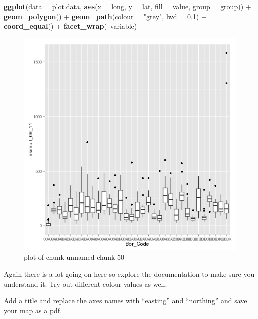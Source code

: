 \documentclass[]{article}
\makeatletter
\newenvironment{Shaded}{}{}
\newcommand{\KeywordTok}[1]{\textcolor[rgb]{0.00,0.44,0.13}{\textbf{{#1}}}}
\newcommand{\DataTypeTok}[1]{\textcolor[rgb]{0.56,0.13,0.00}{{#1}}}
\newcommand{\FloatTok}[1]{\textcolor[rgb]{0.25,0.63,0.44}{{#1}}}
\newcommand{\StringTok}[1]{\textcolor[rgb]{0.25,0.44,0.63}{{#1}}}
\newcommand{\NormalTok}[1]{{#1}}
\def\maxwidth{\ifdim\Gin@nat@width>\linewidth\linewidth
\else\Gin@nat@width\fi}
\let\Oldincludegraphics\includegraphics
\renewcommand{\includegraphics}[1]{\Oldincludegraphics[width=\maxwidth]{#1}}
\makeatother
\begin{document}
\begin{Shaded}
\begin{Highlighting}[]
\KeywordTok{ggplot}\NormalTok{(}\DataTypeTok{data =} \NormalTok{plot.data, }\KeywordTok{aes}\NormalTok{(}\DataTypeTok{x =} \NormalTok{long, }\DataTypeTok{y =} \NormalTok{lat, }\DataTypeTok{fill =} \NormalTok{value, }\DataTypeTok{group =} \NormalTok{group)) + }
    \KeywordTok{geom_polygon}\NormalTok{() + }\KeywordTok{geom_path}\NormalTok{(}\DataTypeTok{colour =} \StringTok{"grey"}\NormalTok{, }\DataTypeTok{lwd =} \FloatTok{0.1}\NormalTok{) + }\KeywordTok{coord_equal}\NormalTok{() + }
    \KeywordTok{facet_wrap}\NormalTok{(~variable)}
\end{Highlighting}
\end{Shaded}
\begin{figure}[htbp]
\centering
\includegraphics{figure/unnamed-chunk-50.png}
\caption{plot of chunk unnamed-chunk-50}
\end{figure}

Again there is a lot going on here so explore the documentation to make
sure you understand it. Try out different colour values as well.

Add a title and replace the axes names with ``easting'' and ``northing''
and save your map as a pdf.
\end{document}
